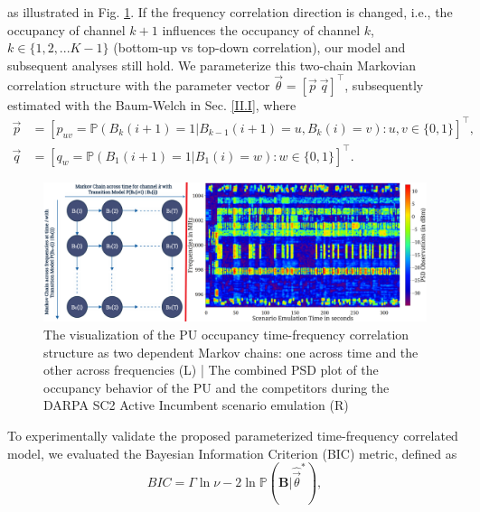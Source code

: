 \documentclass[10pt, twocolumn]{IEEEtran}
\begin{document}
as illustrated in Fig. \ref{fig:A.3}. If the frequency correlation direction is changed, i.e., the occupancy of channel $k+1$ influences the occupancy of channel $k$, $k{\in}\{1,2,...K{-}1\}$ (bottom-up vs top-down correlation), our model and subsequent analyses still hold. We parameterize this two-chain Markovian correlation structure with the parameter vector $\vec{\theta}=[\vec{p}\ \vec{q}]^{\intercal}$, 
subsequently estimated with the Baum-Welch
in Sec. \ref{II.I},
where
\begin{equation}\label{7}
    \begin{aligned}
        \vec{p}&{=}[p_{uv}{=}\mathbb{P}(B_{k}(i{+}1){=}1{|}B_{k{-}1}(i{+}1){=}u{,}B_{k}(i){=}v){:}u{,}v{\in}\{0{,}1\}]^{\intercal},\\
        \vec{q}&{=}[q_{w}{=}\mathbb{P}(B_{1}(i{+}1){=}1{|}B_{1}(i){=}w){:}w{\in}\{0{,}1\}]^{\intercal}.
    \end{aligned}
\end{equation}
\begin{figure} [t]
    \centerline{
    \includegraphics[width=1.0\linewidth]{figures/Minerva_Markov_Chain_with_Aggregated_PSD_Observations.png}}
    \vspace{-2mm}
    \caption{The visualization of the PU occupancy time-frequency correlation structure as two dependent Markov chains: one across time and the other across frequencies (L) | The combined PSD plot of the occupancy behavior of the PU and the competitors during the DARPA SC2 Active Incumbent scenario emulation (R)}
    \label{fig:A.3}
    \vspace{-5mm}
\end{figure}
To experimentally validate the proposed parameterized time-frequency correlated model, we  evaluated the Bayesian Information Criterion (BIC) metric,
defined as
\begin{equation}
\label{BIC}
   BIC = \Gamma \ln{\nu} - 2\ln{\mathbb{P}(\mathbf{B}|\hat{\vec{\theta}}^*)},
\end{equation}
\end{document}
